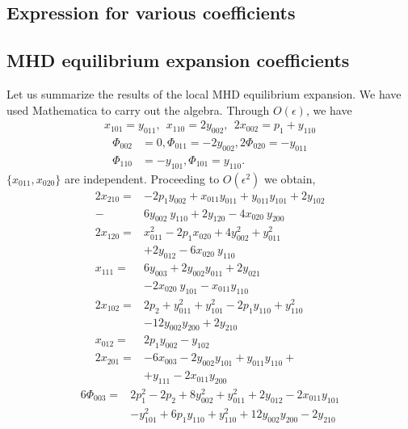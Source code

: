 \documentclass[aip,pop,reprint]{revtex4-1}
\begin{document}
\begin{appendices}
\section{Expression for various coefficients \label{appendix B}}
\subsection*{MHD equilibrium expansion coefficients}
Let us summarize the results of the local MHD equilibrium expansion. We have used Mathematica to carry out the algebra. Through $O(\epsilon)$, we have
\begin{align}
x_{101} = y_{011}, \:\: x_{110} = 2 y_{002}, \:\: 2x_{002} =  p_1+y_{110}
\end{align}  
\begin{align}
\Phi_{002} &= 0, \Phi_{011} = -2 y_{002}, 2\Phi_{020} = -y_{011} \nonumber\\
\Phi_{110} &= -y_{101}, \Phi_{101} = y_{110}.
\end{align}
$\{x_{011},x_{020}\}$ are independent. 
Proceeding to $O(\epsilon^2)$ we obtain,
\begin{align}
2x_{210} = &-2 p_1 y_{002}  + x_{011} y_{011} +y_{011} y_{101} + 2 y_{102} \nonumber \\
- &6 y_{002}\: y_{110} + 2 y_{120} - 4 x_{020}\: y_{200} \nonumber \\
2x_{120} = &x_{011}^2 - 2 p_1 x_{020} + 4 y_{002}^2 + y_{011}^2  \nonumber \\
&+ 2 y_{012}- 6 x_{020}\: y_{110} \\
x_{111} = 
& 6 y_{003} + 2 y_{002} y_{011} + 2 y_{021} \nonumber\\
 &- 2 x_{020}\: y_{101} - x_{011} y_{110}\nonumber\\
  2x_{102} = 
 &2 p_2 + y_{011}^2 + y_{101}^2 - 2 p_1 y_{110} + y_{110}^2\nonumber\\
 &- 12 y_{002} y_{200} +2 y_{210}\nonumber\\
x_{012} = &2 p_1 y_{002} - y_{102}\nonumber\\
2x_{201}= 
 &-6 x_{003} - 2 y_{002} y_{101}+ y_{011} y_{110} + \nonumber\\ 
 &+y_{111} - 2 x_{011} y_{200}\nonumber
 \end{align}
\begin{align}
6\Phi_{003} = &2 p_1^2 - 2 p_2 + 8 y_{002}^2 + y_{011}^2 + 2 y_{012} - 2 x_{011} y_{101}\nonumber\\ 
& - y_{101}^2 + 6 p_1 y_{110} + y_{110}^2 + 12 y_{002} y_{200} - 2 y_{210} \nonumber\\

\end{align}
\end{appendices}
\end{document}
